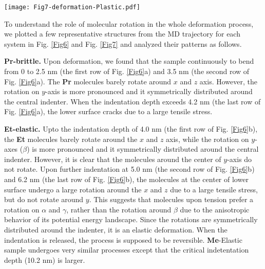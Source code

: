 \documentclass[prb,superscriptaddress,longbibliography, twocolumn]{revtex4-1}
\begin{document}




\begin{figure*}[htbp]
\centering
\texttt{[image: Fig7-deformation-Plastic.pdf]}
\caption{\label{Fig7} The list of representative snapshots from the simulation of \textbf{Me}-plastic deformation.}
\end{figure*}

To understand the role of molecular rotation in the whole deformation process, we plotted a few representative structures from the MD trajectory for each system in Fig. \ref{Fig6} and Fig. \ref{Fig7} and analyzed their patterns as follows.

\textbf{Pr-brittle.} Upon deformation, we found that the sample continuously to bend from 0 to 2.5 nm (the first row of Fig. \ref{Fig6}a) and 3.5 nm (the second row of Fig. \ref{Fig6}a). The \textbf{Pr} molecules barely rotate around $x$ and $z$ axis. However, the rotation on $y$-axis is more pronounced and it symmetrically distributed around the central indenter. When the indentation depth exceeds 4.2 nm (the last row of Fig. \ref{Fig6}a), the lower surface cracks due to a large tensile stress. 

\textbf{Et-elastic.} Upto the indentation depth of 4.0 nm (the first row of Fig. \ref{Fig6}b), the \textbf{Et} molecules barely rotate around the $x$ and $z$ axis, while the rotation on $y$-axes ($\beta$) is more pronounced and it symmetrically distributed around the central indenter. However, it is clear that the molecules around the center of $y$-axis do not rotate. Upon further indentation at 5.0 nm (the second row of Fig. \ref{Fig6}b) and 6.2 nm (the last row of Fig. \ref{Fig6}b), the molecules at the center of lower surface undergo a large rotation around the $x$ and $z$ due to a large tensile stress, but do not rotate around $y$. This suggests that molecules upon tension prefer a rotation on $\alpha$ and $\gamma$, rather than the rotation around $\beta$ due to the anisotropic behavior of its potential energy landscape. Since the rotations are symmetrically distributed around the indenter, it is an elastic deformation. When the indentation is released, the process is supposed to be reversible. \textbf{Me}-Elastic sample undergoes very similar processes except that the critical indetentation depth (10.2 nm) is larger. 
\end{document}
